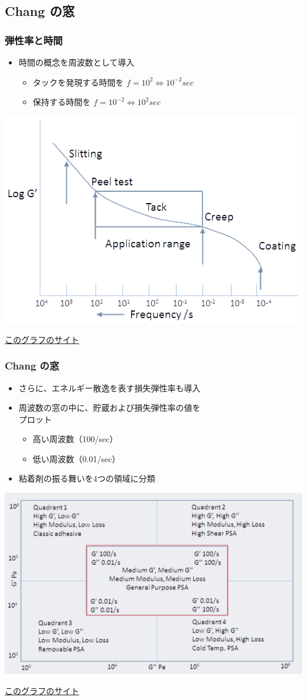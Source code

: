 \documentclass[unicode,12pt]{beamer}%
\begin{document}
\subsection{Chang の窓}
\begin{frame}
	\frametitle{弾性率と時間}
		\begin{itemize}
			\item 時間の概念を周波数として導入
			\begin{itemize}
				\item タックを発現する時間を $f=10^2 \Leftrightarrow 10^{-2} sec$
				\item 保持する時間を $f=10^{-2} \Leftrightarrow 10^{2} sec$
			\end{itemize}
		\end{itemize}
		\centering
			\includegraphics[width=.6\textwidth]{ChangFrequencies_1.png}

		\href{https://www.stevenabbott.co.uk/practical-adhesion/chang.php}{このグラフのサイト}
\end{frame}

\begin{frame}
	\frametitle{Chang の窓}
		\begin{itemize}
			\item さらに、エネルギー散逸を表す損失弾性率も導入
			\item 周波数の窓の中に、貯蔵および損失弾性率の値を\\プロット
			\begin{itemize}
				\item 高い周波数（100/sec）
				\item 低い周波数（0.01/sec）
			\end{itemize}
			\item 粘着剤の振る舞いを4つの領域に分類
		\end{itemize}

		\vspace{3mm}
		\centering
			\includegraphics[width=.5\textwidth]{ChangFrequencies_2.png}

			\href{https://www.stevenabbott.co.uk/practical-adhesion/chang.php}{このグラフのサイト}
\end{frame}
\end{document}
